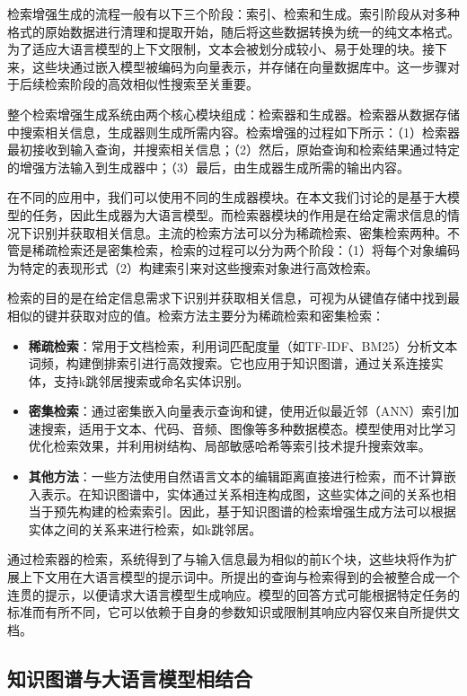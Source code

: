 检索增强生成的流程一般有以下三个阶段：索引、检索和生成。索引阶段从对多种格式的原始数据进行清理和提取开始，随后将这些数据转换为统一的纯文本格式。为了适应大语言模型的上下文限制，文本会被划分成较小、易于处理的块。接下来，这些块通过嵌入模型被编码为向量表示，并存储在向量数据库中。这一步骤对于后续检索阶段的高效相似性搜索至关重要。

整个检索增强生成系统由两个核心模块组成：检索器和生成器。检索器从数据存储中搜索相关信息，生成器则生成所需内容。检索增强的过程如下所示：（1）检索器最初接收到输入查询，并搜索相关信息；（2）然后，原始查询和检索结果通过特定的增强方法输入到生成器中；（3）最后，由生成器生成所需的输出内容。

在不同的应用中，我们可以使用不同的生成器模块。在本文我们讨论的是基于大模型的任务，因此生成器为大语言模型。而检索器模块的作用是在给定需求信息的情况下识别并获取相关信息。主流的检索方法可以分为稀疏检索、密集检索两种。不管是稀疏检索还是密集检索，检索的过程可以分为两个阶段：（1）将每个对象编码为特定的表现形式（2）构建索引来对这些搜索对象进行高效检索。

检索的目的是在给定信息需求下识别并获取相关信息，可视为从键值存储中找到最相似的键并获取对应的值。检索方法主要分为稀疏检索和密集检索：

\begin{itemize}
    \item \textbf{稀疏检索}：常用于文档检索，利用词匹配度量（如TF-IDF、BM25）分析文本词频，构建倒排索引进行高效搜索。它也应用于知识图谱，通过关系连接实体，支持k跳邻居搜索或命名实体识别。
    \item \textbf{密集检索}：通过密集嵌入向量表示查询和键，使用近似最近邻（ANN）索引加速搜索，适用于文本、代码、音频、图像等多种数据模态。模型使用对比学习优化检索效果，并利用树结构、局部敏感哈希等索引技术提升搜索效率。
    \item \textbf{其他方法}：一些方法使用自然语言文本的编辑距离直接进行检索，而不计算嵌入表示。在知识图谱中，实体通过关系相连构成图，这些实体之间的关系也相当于预先构建的检索索引。因此，基于知识图谱的检索增强生成方法可以根据实体之间的关系来进行检索，如k跳邻居\cite{Ye2021, Shu2022}。
\end{itemize}

通过检索器的检索，系统得到了与输入信息最为相似的前K个块，这些块将作为扩展上下文用在大语言模型的提示词中。所提出的查询与检索得到的会被整合成一个连贯的提示，以便请求大语言模型生成响应。模型的回答方式可能根据特定任务的标准而有所不同，它可以依赖于自身的参数知识或限制其响应内容仅来自所提供文档。

\subsection{知识图谱与大语言模型相结合}

